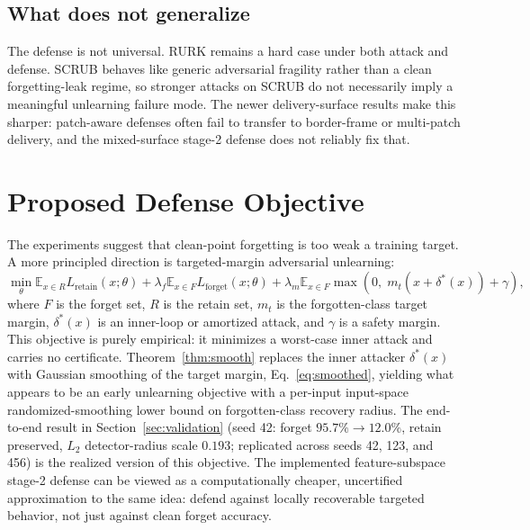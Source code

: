 \documentclass[11pt]{article}
\begin{document}
\subsection{What does not generalize}
The defense is not universal. RURK remains a hard case under both attack and defense. SCRUB behaves like generic adversarial fragility rather than a clean forgetting-leak regime, so stronger attacks on SCRUB do not necessarily imply a meaningful unlearning failure mode. The newer delivery-surface results make this sharper: patch-aware defenses often fail to transfer to border-frame or multi-patch delivery, and the mixed-surface stage-2 defense does not reliably fix that.

\section{Proposed Defense Objective}
The experiments suggest that clean-point forgetting is too weak a training target. A more principled direction is targeted-margin adversarial unlearning:
\begin{equation}
\min_{\theta}
\mathbb{E}_{x \in R} L_{\text{retain}}(x;\theta)
 + \lambda_f \mathbb{E}_{x \in F} L_{\text{forget}}(x;\theta)
 + \lambda_m \mathbb{E}_{x \in F} \max\!\left(0,\; m_t(x + \delta^*(x)) + \gamma \right),
\label{eq:proposed}
\end{equation}
where $F$ is the forget set, $R$ is the retain set, $m_t$ is the forgotten-class target margin, $\delta^*(x)$ is an inner-loop or amortized attack, and $\gamma$ is a safety margin. This objective is purely empirical: it minimizes a worst-case inner attack and carries no certificate. Theorem~\ref{thm:smooth} replaces the inner attacker $\delta^*(x)$ with Gaussian smoothing of the target margin, Eq.~\eqref{eq:smoothed}, yielding what appears to be an early unlearning objective with a per-input input-space randomized-smoothing lower bound on forgotten-class recovery radius. The end-to-end result in Section~\ref{sec:validation} (seed 42: forget $95.7\%\to12.0\%$, retain preserved, $L_2$ detector-radius scale $0.193$; replicated across seeds 42, 123, and 456) is the realized version of this objective. The implemented feature-subspace stage-2 defense can be viewed as a computationally cheaper, uncertified approximation to the same idea: defend against locally recoverable targeted behavior, not just against clean forget accuracy.
\end{document}
